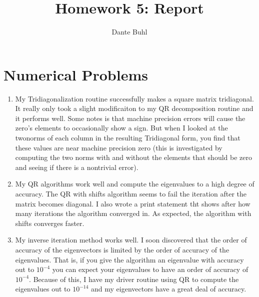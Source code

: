 \documentclass{article}
\title{Homework 5: Report}
\author{Dante Buhl}
\begin{document}
\newcommand{\bs}[1]{\boldsymbol{#1}}
\newcommand{\bmp}[1]{\begin{minipage}{#1\textwidth}}
\newcommand{\emp}{\end{minipage}}
\newcommand{\R}{\mathbb{R}}
\newcommand{\C}{\mathbb{C}}
\newcommand{\N}{\mathcal{N}}
\newcommand{\I}{\mathrm{I}}
\newcommand{\K}{\bs{\mathrm{K}}}
\newcommand{\m}{\bs{\mu}_*}
\newcommand{\s}{\bs{\Sigma}_*}
\newcommand{\dt}{\Delta t}
\newcommand{\tr}[1]{\text{Tr}(#1)}
\newcommand{\Tr}[1]{\text{Tr}(#1)}

\maketitle



\section{Numerical Problems}
\begin{enumerate}
    
\item My Tridiagonalization routine successfully makes a square matrix tridiagonal. It really only took a slight modificaiton to my QR decomposition routine and it performs well. Some notes is that machine precision errors will cause the zero's elements to occasionally show a sign. But when I looked at the twonorms of each column in the resulting Tridiagonal form, you find that these values are near machine precision zero (this is investigated by computing the two norms with and without the elements that should be zero and seeing if there is a nontrivial error).

\item My QR algorithms work well and compute the eigenvalues to a high degree of accuracy. The QR with shifts algorithm seems to fail the iteration after the matrix becomes diagonal. I also wrote a print statement tht shows after how many iterations the algorithm converged in. As expected, the algorithm with shifts converges faster. 

\item My inverse iteration method works well. I soon discovered that the order of accuracy of the eigenvectors is limited by the order of accuracy of the eigenvalues. That is, if you give the algorithm an eigenvalue with accuracy out to $10^{-4}$ you can expect your eigenvalues to have an order of accuracy of $10^{-4}$. Because of this, I have my driver routine using QR to compute the eigenvalues out to $10^{-14}$ and my eigenvectors have a great deal of accuracy. 
   
\end{enumerate}
\end{document}
